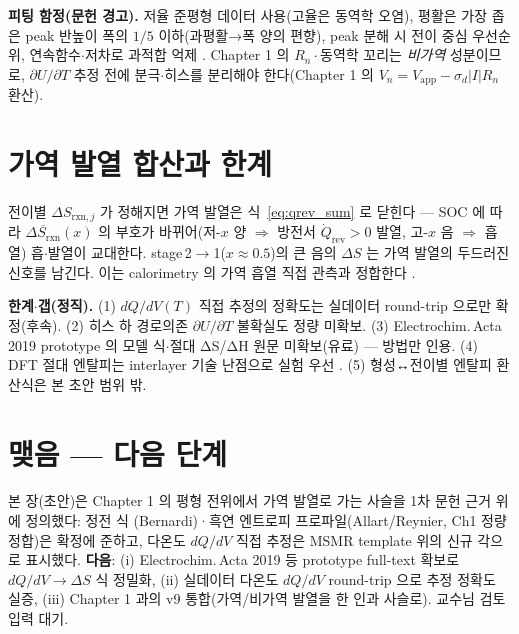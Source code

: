 \documentclass[11pt,a4paper]{article}
\newcommand{\rxn}{\mathrm{rxn}}
\newcommand{\rev}{\mathrm{rev}}
\begin{document}
\textbf{피팅 함정(문헌 경고).} 저율 준평형 데이터 사용(고율은 동역학 오염), 평활은 가장 좁은 peak 반높이
폭의 $1/5$ 이하(과평활→폭 양의 편향), peak 분해 시 전이 중심 우선순위, 연속함수$\cdot$저차로 과적합 억제
\cite{msmr_partI,msmr_partII}. Chapter 1 의 $R_n\cdot$동역학 꼬리는 \emph{비가역} 성분이므로, $\partial U/\partial T$
추정 전에 분극$\cdot$히스를 분리해야 한다(Chapter 1 의 $V_n=V_\mathrm{app}-\sigma_d|I|R_n$ 환산).

\section{가역 발열 합산과 한계}\label{sec:synth}
전이별 $\Delta S_{\rxn,j}$ 가 정해지면 가역 발열은 식~\eqref{eq:qrev_sum} 로 닫힌다 — SOC 에 따라
$\overline{\Delta S_\rxn}(x)$ 의 부호가 바뀌어(저-$x$ 양 $\Rightarrow$ 방전서 $\dot Q_\rev>0$ 발열,
고-$x$ 음 $\Rightarrow$ 흡열) 흡$\cdot$발열이 교대한다. stage\,2$\to$1($x\approx0.5$)의 큰 음의 $\Delta S$
는 가역 발열의 두드러진 신호를 남긴다. 이는 calorimetry 의 가역 흡열 직접 관측과 정합한다
\cite{standardised2024}.

\textbf{한계$\cdot$갭(정직).} (1) $dQ/dV(T)$ 직접 추정의 정확도는 실데이터 round-trip 으로만 확정(후속).
(2) 히스 하 경로의존 $\partial U/\partial T$ 불확실도 정량 미확보. (3) Electrochim.\,Acta 2019 prototype 의
모델 식$\cdot$절대 ΔS/ΔH 원문 미확보(유료) — 방법만 인용. (4) DFT 절대 엔탈피는 interlayer 기술 난점으로
실험 우선 \cite{jpcc2021}. (5) 형성↔전이별 엔탈피 환산식은 본 초안 범위 밖.

\section*{맺음 — 다음 단계}
본 장(초안)은 Chapter 1 의 평형 전위에서 가역 발열로 가는 사슬을 1차 문헌 근거 위에 정의했다: 정전 식
(Bernardi)·흑연 엔트로피 프로파일(Allart/Reynier, Ch1 정량 정합)은 확정에 준하고, 다온도 $dQ/dV$ 직접
추정은 MSMR template 위의 신규 각으로 표시했다. \textbf{다음}: (i) Electrochim.\,Acta 2019 등 prototype
full-text 확보로 $dQ/dV\to\Delta S$ 식 정밀화, (ii) 실데이터 다온도 $dQ/dV$ round-trip 으로 추정 정확도
실증, (iii) Chapter 1 과의 v9 통합(가역/비가역 발열을 한 인과 사슬로). 교수님 검토 입력 대기.
\end{document}
